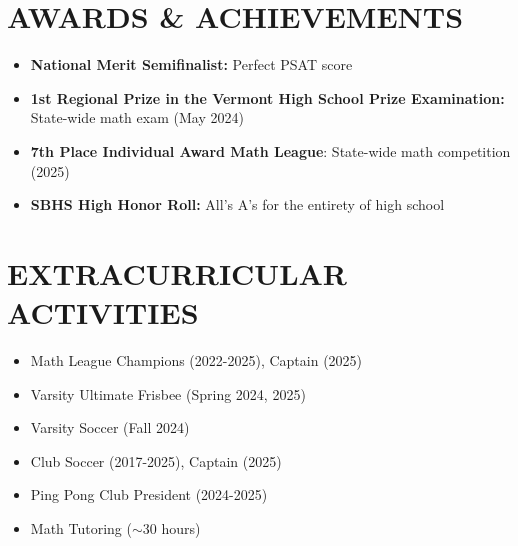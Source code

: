 \documentclass[10pt,letterpaper]{article}
\begin{document}
\section{AWARDS \& ACHIEVEMENTS}
\vspace{0.5em}
\begin{itemize}[leftmargin=*,nosep,itemsep=2pt]
  \item \textbf{National Merit Semifinalist:} Perfect PSAT score
  \item \textbf{1st Regional Prize in the Vermont High School Prize Examination:} State-wide math exam (May 2024)
  \item \textbf{7th Place Individual Award Math League}: State-wide math competition (2025)
  \item \textbf{SBHS High Honor Roll:} All's A's for the entirety of high school
\end{itemize}

\vspace{0.5em}
\section{EXTRACURRICULAR ACTIVITIES}
\vspace{0.5em}
\begin{minipage}[t]{0.48\textwidth}
\begin{itemize}[leftmargin=*,nosep,itemsep=2pt]
  \item Math League Champions (2022-2025), Captain (2025)
  \item Varsity Ultimate Frisbee (Spring 2024, 2025)
  \item Varsity Soccer (Fall 2024)
\end{itemize}
\end{minipage}
\hfill
\begin{minipage}[t]{0.48\textwidth}
\begin{itemize}[leftmargin=*,nosep,itemsep=2pt]
  \item Club Soccer (2017-2025), Captain (2025)
  \item Ping Pong Club President (2024-2025)
  \item Math Tutoring ($\sim$30 hours)
\end{itemize}
\end{minipage}
\end{document}

